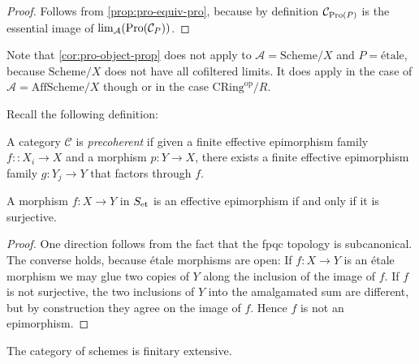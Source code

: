 \begin{proof}
    Follows from \ref{prop:pro-equiv-pro}, because by definition $\mathcal{C}_{\mathrm{Pro}(P)}$ is
    the essential image of $\lim_{\mathcal{A}}(\mathrm{Pro}(\mathcal{C}_{P}))$.
\end{proof}

Note that \ref{cor:pro-object-prop} does not apply to $\mathcal{A} = \mathrm{Scheme} / X$
and $P = \mathrm{étale}$, because $\mathrm{Scheme} / X$ does not have all cofiltered limits. It
does apply in the case of $\mathcal{A} = \mathrm{AffScheme} / X$ though or in the case
$\mathrm{CRing}^{\mathrm{op}} / R$.

Recall the following definition:

\begin{definition}
    A category $\mathcal{C}$ is \emph{precoherent} if given a finite effective epimorphism family
    $f\colon \colon X_i \to X$ and a morphism $p\colon Y \to X$, there exists a finite effective epimorphism family
    $g\colon Y_j \to Y$ that factors through $f$.
\end{definition}

\begin{lemma}
    A morphism $f\colon X \to Y$ in $S_{\mathrm{et}}$ is an effective epimorphism if and only if
    it is surjective.
    \label{lemma:et-effective-epi}
    \leanok
\end{lemma}

\begin{proof}
    \leanok
    One direction follows from the fact that the fpqc topology is subcanonical. The converse
    holds, because étale morphisms are open: If $f\colon X \to Y$ is an étale morphism
    we may glue two copies of $Y$ along the inclusion of the image of $f$. If $f$ is not surjective,
    the two inclusions of $Y$ into the amalgamated sum are different, but by construction
    they agree on the image of $f$. Hence $f$ is not an epimorphism.
\end{proof}

\begin{lemma}
    The category of schemes is finitary extensive.
    \leanok
    \label{lemma:scheme-finitaryextensive}
\end{lemma}

